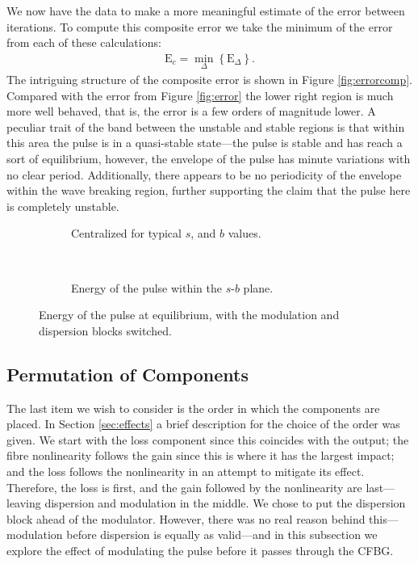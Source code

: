 We now have the data to make a more meaningful estimate of the error between iterations. To compute this composite error we take the minimum of the error from each of these calculations:
\begin{align}
\textrm{E}_c = \min_\Delta \left\{ \textrm{E}_\Delta \right\}.
\label{eq:errorcomp}
\end{align}
The intriguing structure of the composite error is shown in Figure \ref{fig:errorcomp}. Compared with the error from Figure \ref{fig:error} the lower right region is much more well behaved, that is, the error is a few orders of magnitude lower. A peculiar trait of the band between the unstable and stable regions is that within this area the pulse is in a quasi-stable state---the pulse is stable and has reach a sort of equilibrium, however, the envelope of the pulse has minute variations with no clear period. Additionally, there appears to be no periodicity of the envelope within the wave breaking region, further supporting the claim that the pulse here is completely unstable. \\

\begin{figure}[p]
\centering
\begin{subfigure}{\textwidth}

\caption{Centralized for typical $s$, and $b$ values.}
\label{fig:switchzoom}
\end{subfigure} \\
\begin{subfigure}{\textwidth}

\caption{Energy of the pulse within the $s$-$b$ plane.}
\label{fig:switchbig}
\end{subfigure}
\caption{Energy of the pulse at equilibrium, with the modulation and dispersion blocks switched.}
\label{fig:switch}
\end{figure}

\subsection{Permutation of Components}
The last item we wish to consider is the order in which the components are placed. In Section \ref{sec:effects} a brief description for the choice of the order was given. We start with the loss component since this coincides with the output; the fibre nonlinearity follows the gain since this is where it has the largest impact; and the loss follows the nonlinearity in an attempt to mitigate its effect. Therefore, the loss is first, and the gain followed by the nonlinearity are last---leaving dispersion and modulation in the middle. We chose to put the dispersion block ahead of the modulator. However, there was no real reason behind this---modulation before dispersion is equally as valid---and in this subsection we explore the effect of modulating the pulse before it passes through the CFBG. \\

